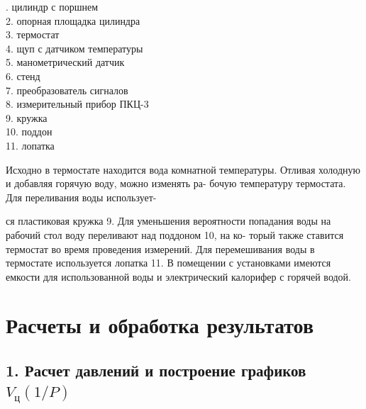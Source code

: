 \documentclass[12pt]{article}
\begin{document}
\vspace{1em} %

. цилиндр с поршнем \\
2. опорная площадка цилиндра \\
3. термостат \\
4. щуп с датчиком температуры \\
5. манометрический датчик \\
6. стенд \\
7. преобразователь сигналов \\
8. измерительный прибор ПКЦ-3 \\
9. кружка \\
10. поддон \\
11. лопатка

\vspace{1em} %

\setlength{\parindent}{1.5em} %
Исходно в термостате находится вода комнатной температуры.
Отливая холодную и добавляя горячую воду, можно изменять ра-
бочую температуру термостата. Для переливания воды использует-

\vfill

\newpage
\vspace{1em} %

\setlength{\parindent}{1.5em} %

\hspace*{1.5em} ся пластиковая кружка 9. Для уменьшения вероятности попадания
воды на рабочий стол воду переливают над поддоном 10, на ко-
торый также ставится термостат во время проведения измерений.
Для перемешивания воды в термостате используется лопатка 11.
В помещении с установками имеются емкости для использованной
воды и электрический калорифер с горячей водой.


\newpage %

\section*{Расчеты и обработка результатов}

\subsection*{1. Расчет давлений и построение графиков $V_{\text{ц}}(1/P)$}
\end{document}
